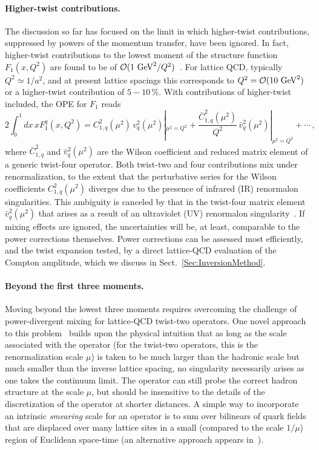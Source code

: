 \paragraph*{Higher-twist contributions.}
%
The discussion so far has focused on the limit in which higher-twist 
contributions, suppressed by powers of the momentum transfer, have been ignored.
%
In fact, higher-twist contributions to the lowest moment of the structure 
function $F_1(x,Q^2)$ are found to be of 
${\cal O}(1\mbox{ GeV}^2/Q^2)$~\cite{Blumlein:2008kz}.
%
For lattice QCD, typically $Q^2 \simeq 1/a^2$, and at present lattice spacings 
this corresponds to $Q^2 = {\cal O}(10\mbox{ GeV}^2)$ or a higher-twist 
contribution of $5 - 10\, \%$. 
%
With contributions of higher-twist included, the OPE for $F_1$ reads
\begin{equation}
2 \int_0^1 dx\, x F_1^q(x,Q^2) = C_{1,q}^2(\mu^2)\, v_q^2(\mu^2)|_{\mu^2=Q^2} + \frac{\bar{C}_{1,q}^2(\mu^2)}{Q^2}\, \bar{v}_q^2(\mu^2)|_{\mu^2=Q^2} + \cdots \,,
\label{tex}
\end{equation}
where $\bar{C}_{1,q}^2$ and $\bar{v}_q^2(\mu^2)$ are the Wilson coefficient and 
reduced matrix element of a generic twist-four operator. 
%
Both twist-two and four contributions mix under renormalization, to the extent 
that the perturbative series for the Wilson coefficients $C_{1,q}^2(\mu^2)$ 
diverges due to the presence of infrared (IR) renormalon singularities.
%
This ambiguity is canceled by that in the twist-four matrix element 
$\bar{v}_q^2(\mu^2)$ that arises as a result of an ultraviolet (UV) 
renormalon singularity~\cite{Martinelli:1996pk}. 
%
If mixing effects are ignored, the uncertainties will be, at least, comparable 
to the power corrections themselves.
%
Power corrections can be assessed most efficiently, and the twist expansion 
tested, by a direct lattice-QCD evaluation of the Compton amplitude, which we 
discuss in Sect.~\ref{Sec:InversionMethod}.

\paragraph*{Beyond the first three moments.}
%
Moving beyond the lowest three moments requires overcoming the challenge of 
power-divergent mixing for lattice-QCD twist-two operators.
%
One novel approach to this problem~\cite{Davoudi:2012ya} builds upon the 
physical intuition that as long as the scale associated with the operator 
(for the twist-two operators, this is the renormalization scale $\mu$) is taken 
to be much larger than the hadronic scale but much smaller than the inverse 
lattice spacing, no singularity necessarily arises as one takes the continuum 
limit.
%
The operator can still probe the correct hadron structure at the scale $\mu$, 
but should be insensitive to the details of the discretization of the operator 
at shorter distances.
%
A simple way to incorporate an intrinsic {\it smearing} scale for an operator 
is to sum over bilinears of quark fields that are displaced over many lattice 
sites in a small (compared to the scale $1/\mu$) region of Euclidean space-time 
(an alternative approach appears in~\cite{Monahan:2015lha}).

